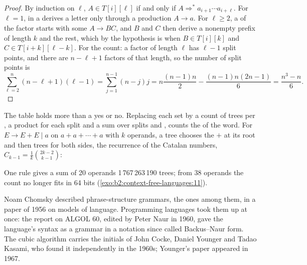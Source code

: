 \begin{proof}
By induction on $\ell$, $A \in T[i][\ell]$ if and only if $A \Rightarrow^* a_{i+1} \cdots a_{i+\ell}$. For $\ell = 1$,
in  a  derives a letter only through a production $A \to a$. For $\ell \ge 2$, a
 of the factor starts with some $A \to BC$, and $B$ and $C$ then derive a nonempty prefix of length $k$ and
the rest, which by the hypothesis is when $B \in T[i][k]$ and $C \in T[i + k][\ell - k]$. For the count: a factor of
length $\ell$ has $\ell - 1$ split points, and there are $n - \ell + 1$ factors of that length, so the number of
split points is
\[
\sum_{\ell=2}^{n} (n - \ell + 1)(\ell - 1) = \sum_{j=1}^{n-1} (n - j)j = n \frac{(n - 1)n}{2} - \frac{(n - 1)n(2n -
1)}{6} = \frac{n^3 - n}{6}.
\]
\end{proof}

The table holds more than a yes or no. Replacing each set by a count of trees per , a product for each
split and a sum over splits and , counts the  of the word. For $E \to E + E \mid a$ on $a + a +
\cdots + a$ with $k$ operands, a tree chooses the $+$ at its root and then trees for both sides, the recurrence of the
Catalan numbers, $C_{k-1} = \frac{1}{k}\binom{2k - 2}{k - 1}$:

\label{out:b2:context-free-languages:catalan}

One  rule gives a sum of 20 operands 1\,767\,263\,190 trees; from 38 operands the count no longer fits in
64 bits (\cref{exo:b2:context-free-languages:11}).

\begin{history}
Noam Chomsky described phrase-structure grammars, the  ones among them, in a paper of 1956 on models of
language. Programming languages took them up at once: the report on ALGOL 60, edited by Peter Naur in 1960, gave the
language's syntax as a grammar in a notation since called Backus--Naur form. The cubic algorithm carries the initials
of John Cocke, Daniel Younger and Tadao Kasami, who found it independently in the 1960s; Younger's paper appeared in
1967.
\end{history}

